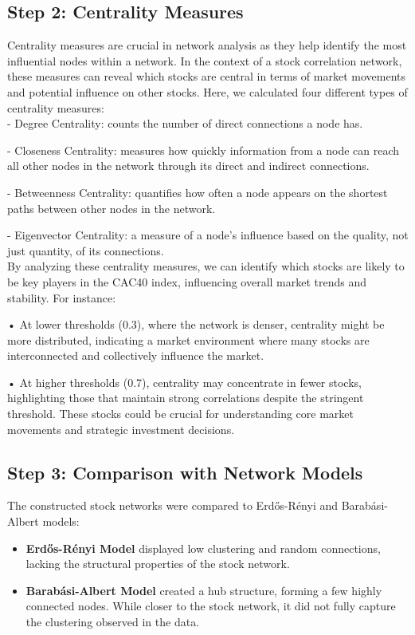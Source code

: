 \documentclass[12pt]{article}
\begin{document}
\subsection{Step 2: Centrality Measures}
Centrality measures are crucial in network analysis as they help identify the most influential nodes within a network. In the context of a stock correlation network, these measures can reveal which stocks are central in terms of market movements and potential influence on other stocks. Here, we calculated four different types of centrality measures:\\

- Degree Centrality: counts the number of direct connections a node has. 

- Closeness Centrality: measures how quickly information from a node can reach all other nodes in the network through its direct and indirect connections. 

- Betweenness Centrality: quantifies how often a node appears on the shortest paths between other nodes in the network. 

- Eigenvector Centrality: a measure of a node's influence based on the quality, not just quantity, of its connections. \\

By analyzing these centrality measures, we can identify which stocks are likely to be key players in the CAC40 index, influencing overall market trends and stability. For instance:

•	At lower thresholds (0.3), where the network is denser, centrality might be more distributed, indicating a market environment where many stocks are interconnected and collectively influence the market.

•	At higher thresholds (0.7), centrality may concentrate in fewer stocks, highlighting those that maintain strong correlations despite the stringent threshold. These stocks could be crucial for understanding core market movements and strategic investment decisions.

\subsection{Step 3: Comparison with Network Models}
The constructed stock networks were compared to Erdős-Rényi and Barabási-Albert models:
\begin{itemize}
    \item \textbf{Erdős-Rényi Model} displayed low clustering and random connections, lacking the structural properties of the stock network.
    \item \textbf{Barabási-Albert Model} created a hub structure, forming a few highly connected nodes. While closer to the stock network, it did not fully capture the clustering observed in the data.
\end{itemize}
\end{document}
